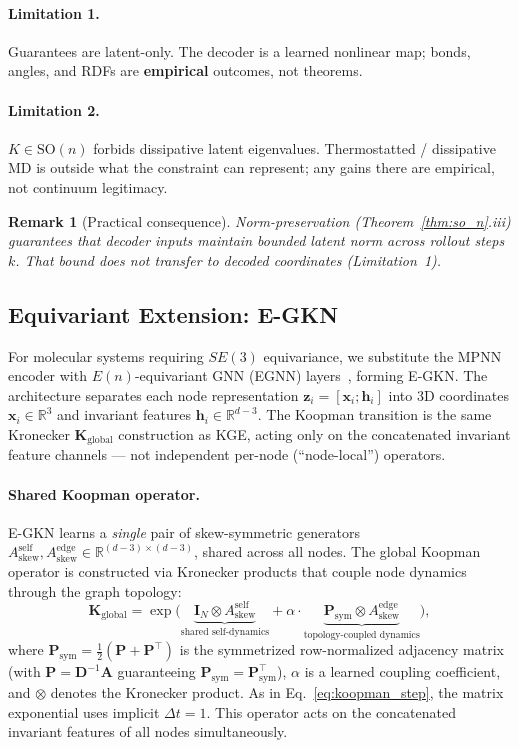 \documentclass{article}
\newcommand{\K}{\mathbf{K}}
\newcommand{\z}{\mathbf{z}}
\newcommand{\x}{\mathbf{x}}
\newcommand{\Ask}{A_{\mathrm{skew}}}
\newcommand{\R}{\mathbb{R}}
\newcommand{\GKE}{\textsc{KGE}}
\newcommand{\EGKN}{\textsc{E-GKN}}
\newtheorem{remark}{Remark}
\begin{document}
\paragraph{Limitation 1.}
Guarantees are latent-only. The decoder is a learned nonlinear map; bonds, angles, and RDFs are \textbf{empirical} outcomes, not theorems.

\paragraph{Limitation 2.}
$K\in\mathrm{SO}(n)$ forbids dissipative latent eigenvalues. Thermostatted / dissipative MD is outside what the constraint can represent; any gains there are empirical, not continuum legitimacy.

\begin{remark}[Practical consequence]
Norm-preservation (Theorem~\ref{thm:so_n}.iii) guarantees that decoder \emph{inputs} maintain bounded latent norm across rollout steps $k$. That bound does not transfer to decoded coordinates (Limitation~1).
\end{remark}

\subsection{Equivariant Extension: E-GKN}
\label{sec:egkn}

For molecular systems requiring $SE(3)$ equivariance, we substitute the MPNN encoder with $E(n)$-equivariant GNN (EGNN) layers~\citep{satorras2021n}, forming \EGKN{}. The architecture separates each node representation $\z_i = [\x_i; \mathbf{h}_i]$ into 3D coordinates $\x_i \in \R^3$ and invariant features $\mathbf{h}_i \in \R^{d-3}$. The Koopman transition is the same Kronecker $\K_{\text{global}}$ construction as \GKE{}, acting only on the concatenated invariant feature channels --- not independent per-node (``node-local'') operators.

\paragraph{Shared Koopman operator.}
E-GKN learns a \emph{single} pair of skew-symmetric generators $\Ask^{\text{self}}, \Ask^{\text{edge}} \in \R^{(d-3) \times (d-3)}$, shared across all nodes. The global Koopman operator is constructed via Kronecker products that couple node dynamics through the graph topology:
\begin{equation}
  \K_{\text{global}} = \exp\!\bigl(\underbrace{\mathbf{I}_N \otimes \Ask^{\text{self}}}_{\text{shared self-dynamics}} + \alpha \cdot \underbrace{\mathbf{P}_{\text{sym}} \otimes \Ask^{\text{edge}}}_{\text{topology-coupled dynamics}}\bigr),
\end{equation}
where $\mathbf{P}_{\text{sym}} = \frac{1}{2}(\mathbf{P} + \mathbf{P}^\top)$ is the symmetrized row-normalized adjacency matrix (with $\mathbf{P} = \mathbf{D}^{-1}\mathbf{A}$ guaranteeing $\mathbf{P}_{\text{sym}} = \mathbf{P}_{\text{sym}}^\top$), $\alpha$ is a learned coupling coefficient, and $\otimes$ denotes the Kronecker product. As in Eq.~\eqref{eq:koopman_step}, the matrix exponential uses implicit $\Delta t=1$. This operator acts on the concatenated invariant features of all nodes simultaneously.
\end{document}
